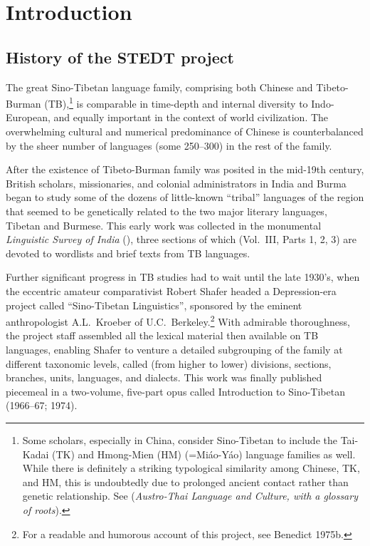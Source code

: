 \vspace{0.25em}


\renewcommand{\thefootnote}{\arabic{footnote}}
\setcounter{footnote}{0}

\chapter*{Introduction}

\section{History of the STEDT project}

The great Sino-Tibetan language family, comprising both Chinese and Tibeto-Burman (TB),\footnote{Some scholars, especially in China, consider Sino-Tibetan to include the Tai-Kadai (TK) and Hmong-Mien (HM) (=Mi\'ao-Y\'ao) language families as well.  While there is definitely a striking typological similarity among Chinese, TK, and HM, this is undoubtedly due to prolonged ancient contact rather than genetic relationship.  See \citealt{PB-ATLC} (\textit{Austro-Thai Language and Culture, with a glossary of roots}).} is comparable in time-depth and internal diversity to Indo-European, and equally important in the context of world civilization. The overwhelming cultural and numerical predominance of Chinese is counterbalanced by the sheer number of languages (some 250–300) in the rest of the family.

After the existence of Tibeto-Burman family was posited in the mid-19th century, British scholars, missionaries, and colonial administrators in India and Burma began to study some of the dozens of little-known “tribal” languages of the region that seemed to be genetically related to the two major literary languages, Tibetan and Burmese. This early work was collected in the monumental \textit{Linguistic Survey of India} (\citealt{LSI}), three sections of which (Vol.~III, Parts 1, 2, 3) are devoted to wordlists and brief texts from TB languages.

Further significant progress in TB studies had to wait until the late 1930’s, when the eccentric amateur comparativist Robert Shafer headed a Depression-era project called “Sino-Tibetan Linguistics”, sponsored by the eminent anthropologist A.L.\ Kroeber of U.C.\ Berkeley.\footnote{For a readable and humorous account of this project, see Benedict 1975b.} With admirable thoroughness, the project staff assembled all the lexical material then available on TB languages, enabling Shafer to venture a detailed subgrouping of the family at different taxonomic levels, called (from higher to lower) divisions, sections, branches, units, languages, and dialects. This work was finally published piecemeal in a two-volume, five-part opus called Introduction to Sino-Tibetan (1966–67; 1974).

